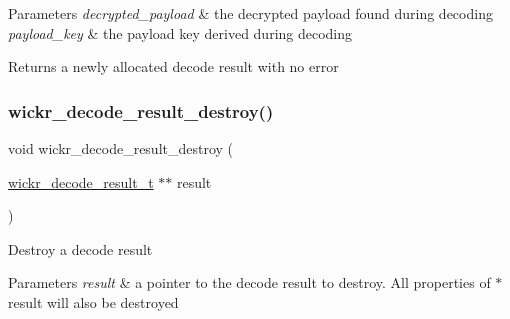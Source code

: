 \begin{DoxyParams}{Parameters}
{\em decrypted\+\_\+payload} & the decrypted payload found during decoding \\
\hline
{\em payload\+\_\+key} & the payload key derived during decoding \\
\hline
\end{DoxyParams}
\begin{DoxyReturn}{Returns}
a newly allocated decode result with no error 
\end{DoxyReturn}
\mbox{\label{group__wickr__protocol_ga94154ab44a6c2e9b97a115e37416efe1}} 
\subsubsection{\texorpdfstring{wickr\_decode\_result\_destroy()}{wickr\_decode\_result\_destroy()}}
{\footnotesize\ttfamily void wickr\+\_\+decode\+\_\+result\+\_\+destroy (\begin{DoxyParamCaption}\item[{\mbox{\hyperlink{structwickr__decode__result}{wickr\+\_\+decode\+\_\+result\+\_\+t}} $\ast$$\ast$}]{result }\end{DoxyParamCaption})}

Destroy a decode result


\begin{DoxyParams}{Parameters}
{\em result} & a pointer to the decode result to destroy. All properties of \textquotesingle{}$\ast$result\textquotesingle{} will also be destroyed \\
\hline
\end{DoxyParams}
\mbox{\label{group__wickr__protocol_ga32d9da2e10d1d653b2ac894d50aaedb0}} 
